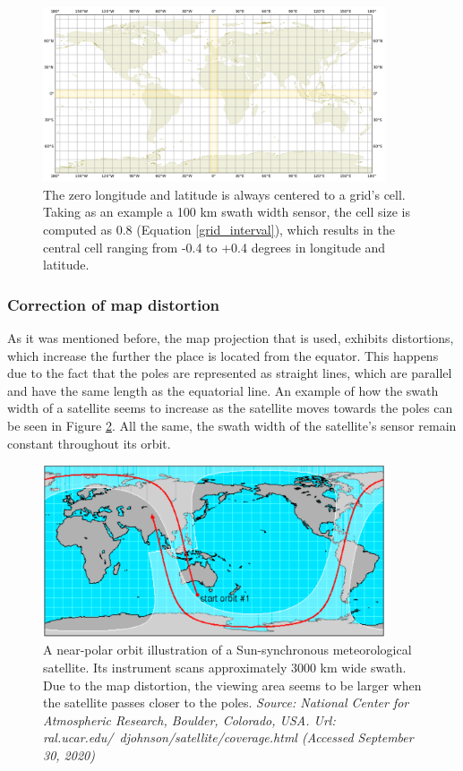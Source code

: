 \begin{figure}
\centering
\includegraphics[width=0.9\textwidth]{Images/map_projection_0covered.png}\caption{The zero longitude and latitude is always centered to a grid's cell. Taking as an example a 100 km swath width sensor, the cell size is computed as 0.8 (Equation \ref{grid_interval}), which results in the central cell ranging from -0.4 to +0.4 degrees in longitude and latitude.}
\label{map_projection_0covered}
\end{figure}

\bigskip
\subsubsection{Correction of map distortion}
\label{Correction of map distortion}
\bigskip

As it was mentioned before, the map projection that is used, exhibits distortions, which increase the further the place is located from the equator. This happens due to the fact that the poles are represented as straight lines, which are parallel and have the same length as the equatorial line. An example of how the swath width of a satellite seems to increase as the satellite moves towards the poles can be seen in Figure \ref{distortion_show-swath-width}. All the same, the swath width of the satellite's sensor remain constant throughout its orbit.

\begin{figure}
\centering
\includegraphics[width=0.9\textwidth]{Images/distortion_show-swath-width.png}\caption{A near-polar orbit illustration of a Sun-synchronous meteorological satellite. Its instrument scans approximately 3000 km wide swath. Due to the map distortion, the viewing area seems to be larger when the satellite passes closer to the poles. \textit{Source: National Center for Atmospheric Research, Boulder, Colorado, USA. Url: ral.ucar.edu/~djohnson/satellite/coverage.html (Accessed September 30, 2020)}}
\label{distortion_show-swath-width}
\end{figure}

